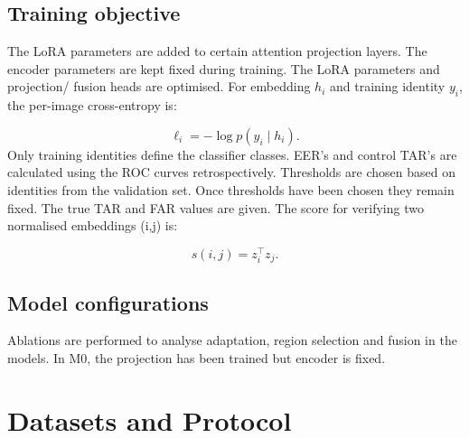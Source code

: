 \documentclass[10pt,lettersize,journal]{IEEEtran}
\begin{document}
\subsection{Training objective}
The LoRA parameters are added to certain attention projection layers. The encoder parameters are kept fixed during training. The LoRA parameters and projection/ fusion heads are optimised. For embedding \ensuremath{h_i} and training identity \ensuremath{y_i}, the per-image cross-entropy is:\par
\begin{equation}
\ell_i=-\log p(y_i\mid h_i).
\end{equation}
Only training identities define the classifier classes. EER’s and control TAR’s are calculated using the ROC curves retrospectively. Thresholds are chosen based on identities from the validation set. Once thresholds have been chosen they remain fixed. The true TAR and FAR values are given. The score for verifying two normalised embeddings (i,j) is:\par
\begin{equation}
s(i,j)=z_i^{\top}z_j.
\end{equation}
\subsection{Model configurations}
Ablations are performed to analyse adaptation, region selection and fusion in the models. In M0, the projection has been trained but encoder is fixed.\par
\begin{table}[t]\centering
\caption{Model Comparison}
\label{tab:checked1}
\footnotesize\setlength{\tabcolsep}{2pt}
\ifdim\wd\uploadedtablebox>\columnwidth\resizebox{\columnwidth}{!}{\usebox{\uploadedtablebox}}\else\usebox{\uploadedtablebox}\fi
\end{table}
\section{Datasets and Protocol}
\end{document}
